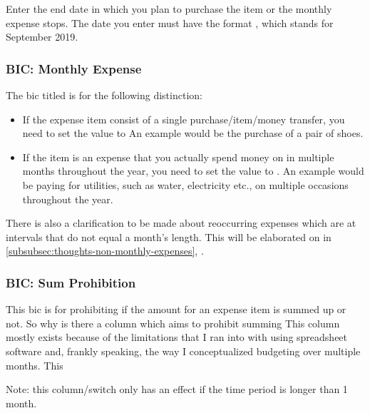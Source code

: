 Enter the end date in which you plan to purchase the item or the monthly expense stops.
The date you enter must have the format , \eg {} which stands for September 2019.

\subsubsection{BIC: Monthly Expense}
\label{subsubsec:budgeting-item-column-monthly-expense}

The \ac{bic} titled  is for the following distinction:
\begin{itemize}
	\item If the expense item consist of a single purchase/item/money transfer, you need to set the value to 
	An example would be the purchase of a pair of shoes.
	\item If the item is an expense that you actually spend money on in multiple months throughout the year, you need to set the value to .
	An example would be paying for \eg utilities, such as water, electricity etc., on multiple occasions throughout the year.
\end{itemize}

There is also a clarification to be made about reoccurring expenses which are at intervals that do not equal a month's length.
This will be elaborated on in \autoref{subsubsec:thoughts-non-monthly-expenses}, .

\subsubsection{BIC: Sum Prohibition}
\label{subsubsec:budgeting-item-column-sum-prohibition}

This \ac{bic} is for prohibiting if the amount for an expense item is summed up or not.
So why is there a column which aims to prohibit summing
This column mostly exists because of the limitations that I ran into with using spreadsheet software and, frankly speaking, the way I conceptualized budgeting over multiple months.
This 



Note: this column/switch only has an effect if the time period is longer than 1 month.

